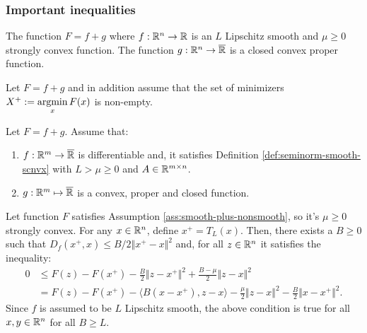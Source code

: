 \documentclass[12pt]{article}
\begin{document}
        \subsubsection{Important inequalities}
            \begin{assumption}\label{ass:smooth-plus-nonsmooth}
                The function $F = f + g$ where $f:\mathbb R^n \rightarrow \mathbb R$ is an $L$ Lipschitz smooth and $\mu \ge 0$ strongly convex function. 
                The function $g:\mathbb R^n \rightarrow \overline {\mathbb R}$ is a closed convex proper function. 
            \end{assumption}
            \begin{assumption}\label{ass:smooth-plus-nonsmooth-x}
                Let $F = f + g$ and in addition assume that the set of minimizers $X^+ := \mathop{\rm argmin}\limits_{x}F(x)$ is non-empty. 
            \end{assumption}
            \begin{assumption}\label{ass:snorm-smth-p-nsmth}
                Let $F = f + g$. Assume that: 
                \begin{enumerate}[noitemsep]
                    \item $f: \mathbb R^m \rightarrow \overline {\mathbb R}$ is differentiable and, it satisfies Definition \ref{def:seminorm-smooth-scnvx} with $L > \mu \ge 0$ and $A \in \mathbb R^{m \times n}$. 
                    \item $g:\mathbb R^m \mapsto \overline {\mathbb R}$ is a convex, proper and closed function. 
                \end{enumerate}
            \end{assumption}
            \begin{theorem}\label{thm:pg-ineq}
                Let function $F$ satisfies Assumption \ref{ass:smooth-plus-nonsmooth}, so it's $\mu \ge 0$ strongly convex. 
                For any $x\in \mathbb R^n$, define $x^+ = T_L(x)$. 
                Then, there exists a $B \ge 0$ such that $D_f(x^+, x) \le B/2 \Vert x^+ - x\Vert^2$ and, for all $z \in \mathbb R^n$ it satisfies the inequality: 
                \begin{align*}
                    0&\le F(z) - F(x^+) - \frac{B}{2}\Vert z - x^+\Vert^2  + \frac{B - \mu}{2}\Vert z - x\Vert^2
                    \\
                    &=  F(z) - F(x^+) - \langle B(x - x^+), z - x\rangle
                    - \frac{\mu}{2}\Vert z - x\Vert^2
                    - \frac{B}{2}\Vert x - x^+\Vert^2. 
                \end{align*}
                Since $f$ is assumed to be $L$ Lipschitz smooth, the above condition is true for all $x, y \in \mathbb R^n$ for all $B \ge L$. 
            \end{theorem}
\end{document}
